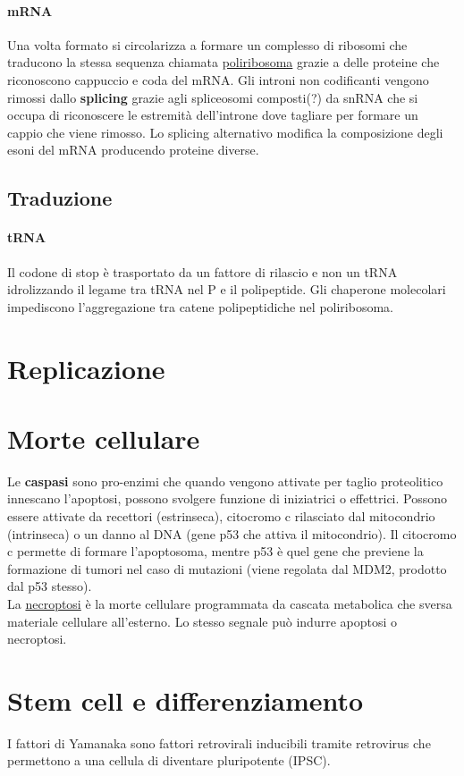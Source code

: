 \documentclass[10pt]{article}
\begin{document}
\paragraph*{mRNA} Una volta formato si circolarizza a formare un complesso di ribosomi che traducono la stessa sequenza chiamata \underline{poliribosoma} grazie a delle proteine che riconoscono cappuccio e coda del mRNA. Gli introni non codificanti vengono rimossi dallo \textbf{splicing} grazie agli spliceosomi composti(?) da snRNA che si occupa di riconoscere le estremità dell'introne dove tagliare per formare un cappio che viene rimosso. Lo splicing alternativo modifica la composizione degli esoni del mRNA producendo proteine diverse.
\subsection*{Traduzione}
\paragraph*{tRNA} Il codone di stop è trasportato da un fattore di rilascio e non un tRNA idrolizzando il legame tra tRNA nel P e il polipeptide. Gli chaperone molecolari impediscono l'aggregazione tra catene polipeptidiche nel poliribosoma. 
\section*{Replicazione}
\section*{Morte cellulare}
Le \textbf{caspasi} sono pro-enzimi che quando vengono attivate per taglio proteolitico innescano l'apoptosi, possono svolgere funzione di iniziatrici o effettrici. Possono essere attivate da recettori (estrinseca), citocromo c rilasciato dal mitocondrio (intrinseca) o un danno al DNA (gene p53 che attiva il mitocondrio). Il citocromo c permette di formare l'apoptosoma, mentre p53 è quel gene che previene la formazione di tumori nel caso di mutazioni (viene regolata dal MDM2, prodotto dal p53 stesso).\\
La \underline{necroptosi} è la morte cellulare programmata da cascata metabolica che sversa materiale cellulare all'esterno. Lo stesso segnale può indurre apoptosi o necroptosi. 
\section*{Stem cell e differenziamento}
I fattori di Yamanaka sono fattori retrovirali inducibili tramite retrovirus che permettono a una cellula di diventare pluripotente (IPSC).
\end{document}
